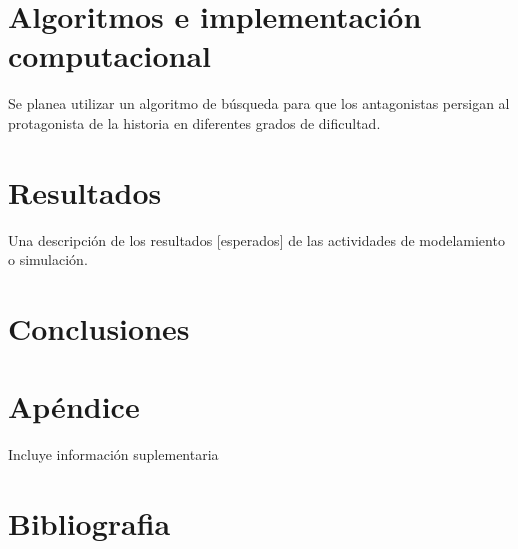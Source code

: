 \documentclass[a4paper]{article}
\begin{document}
\section{Algoritmos e implementación computacional}
Se planea utilizar un algoritmo de búsqueda para que los antagonistas persigan al protagonista de la historia en diferentes grados de dificultad.
\section{Resultados}
Una descripción de los resultados [esperados] de las actividades de
modelamiento o simulación.
\section{Conclusiones}

\section{Apéndice}
Incluye información suplementaria
\section{Bibliografia}
\end{document}
